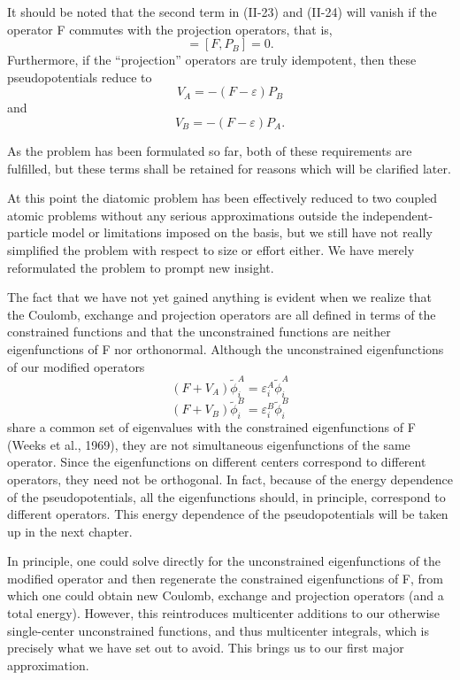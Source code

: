 \documentclass[12pt,letterpaper]{report}
\begin{document}
It should be noted that the second term in (II-23) and (II-24) will vanish if the operator F commutes with the projection operators, that is,
\begin{equation}
[F, P_A] = [F, P_B] = 0.
\end{equation}
Furthermore, if the ``projection'' operators are truly idempotent, then these pseudopotentials reduce to
\begin{equation}
V_A = -(F - \varepsilon)P_B
\end{equation}
and
\begin{equation}
V_B = -(F - \varepsilon)P_A.
\end{equation}

As the problem has been formulated so far, both of these requirements are fulfilled, but these terms shall be retained for reasons which will be clarified later.

At this point the diatomic problem has been effectively reduced to two coupled atomic problems without any serious approximations outside the independent-particle model or limitations imposed on the basis, but we still have not really simplified the problem with respect to size or effort either. We have merely reformulated the problem to prompt new insight.

The fact that we have not yet gained anything is evident when we realize that the Coulomb, exchange and projection operators are all defined in terms of the constrained functions and that the unconstrained functions are neither eigenfunctions of F nor orthonormal. Although the unconstrained eigenfunctions of our modified operators
\begin{equation}
(F + V_A) \tilde{\phi}_i^A = \varepsilon_i^A \tilde{\phi}_i^A
\end{equation}
\begin{equation}
(F + V_B) \tilde{\phi}_i^B = \varepsilon_i^B \tilde{\phi}_i^B
\end{equation}
share a common set of eigenvalues with the constrained eigenfunctions of F (Weeks et al., 1969), they are not simultaneous eigenfunctions of the same operator. Since the eigenfunctions on different centers correspond to different operators, they need not be orthogonal. In fact, because of the energy dependence of the pseudopotentials, all the eigenfunctions should, in principle, correspond to different operators. This energy dependence of the pseudopotentials will be taken up in the next chapter.

In principle, one could solve directly for the unconstrained eigenfunctions of the modified operator and then regenerate the constrained eigenfunctions of F, from which one could obtain new Coulomb, exchange and projection operators (and a total energy). However, this reintroduces multicenter additions to our otherwise single-center unconstrained functions, and thus multicenter integrals, which is precisely what we have set out to avoid. This brings us to our first major approximation.
\end{document}
